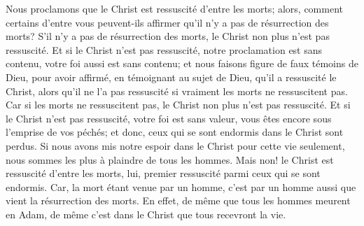 Nous proclamons que le Christ est ressuscité d’entre les morts;
	alors, comment certains d’entre vous peuvent-ils affirmer
		qu’il n’y a pas de résurrection des morts?
S’il n’y a pas de résurrection des morts,
	le Christ non plus n’est pas ressuscité.
Et si le Christ n’est pas ressuscité,
	notre proclamation est sans contenu, votre foi aussi est sans contenu;
	et nous faisons figure de faux témoins de Dieu,
	pour avoir affirmé, en témoignant au sujet de Dieu,
		qu’il a ressuscité le Christ,
	alors qu’il ne l’a pas ressuscité si vraiment les morts ne ressuscitent pas.
Car si les morts ne ressuscitent pas,
	le Christ non plus n’est pas ressuscité.
Et si le Christ n’est pas ressuscité, votre foi est sans valeur,
	vous êtes encore sous l’emprise de vos péchés;
	et donc, ceux qui se sont endormis dans le Christ sont perdus.
Si nous avons mis notre espoir dans le Christ pour cette vie seulement,
	nous sommes les plus à plaindre de tous les hommes.
Mais non! le Christ est ressuscité d’entre les morts,
	lui, premier ressuscité parmi ceux qui se sont endormis.
Car, la mort étant venue par un homme,
	c’est par un homme aussi que vient la résurrection des morts.
En effet, de même que tous les hommes meurent en Adam,
	de même c’est dans le Christ que tous recevront la vie.
